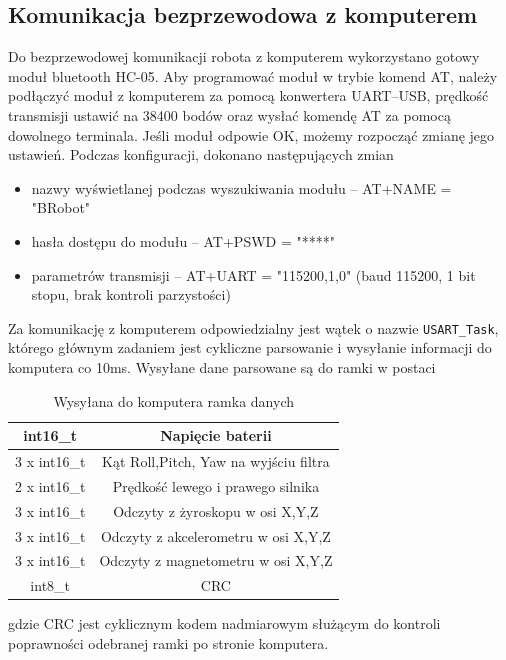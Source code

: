 \subsection{Komunikacja bezprzewodowa z komputerem}

Do bezprzewodowej komunikacji robota z komputerem wykorzystano gotowy moduł bluetooth HC-05. Aby programować moduł w trybie komend AT, należy podłączyć moduł z komputerem za pomocą konwertera UART--USB, prędkość transmisji ustawić na 38400 bodów oraz wysłać komendę AT za pomocą dowolnego terminala. Jeśli moduł odpowie OK, możemy rozpocząć zmianę jego ustawień. Podczas konfiguracji, dokonano następujących zmian
\begin{itemize}
    \item nazwy wyświetlanej podczas wyszukiwania modułu -- AT+NAME = "BRobot"
    \item hasła dostępu do modułu -- AT+PSWD = "****"
    \item parametrów transmisji -- AT+UART = "115200,1,0" (baud 115200, 1 bit stopu, brak kontroli parzystości)
\end{itemize}

Za komunikację z komputerem odpowiedzialny jest wątek o nazwie \texttt{USART\_Task}, którego głównym zadaniem jest cykliczne parsowanie i wysyłanie informacji do komputera co 10ms. Wysyłane dane parsowane są do ramki w postaci

\begin{table}[h!]
    \centering
    \caption{Wysyłana do komputera ramka danych}
    \begin{tabular}{|c|c|}
        \hline
        int16\_t & Napięcie baterii \\
        \hline
        3 x int16\_t & Kąt Roll,Pitch, Yaw na wyjściu filtra \\
        \hline
        2 x int16\_t & Prędkość lewego i prawego silnika \\
        \hline
        3 x int16\_t & Odczyty z żyroskopu w osi X,Y,Z \\
        \hline
        3 x int16\_t & Odczyty z akcelerometru w osi X,Y,Z \\
        \hline
        3 x int16\_t & Odczyty z magnetometru w osi X,Y,Z \\
        \hline
        int8\_t & CRC \\
        \hline
    \end{tabular}
    \label{Ramka wysylana}
\end{table}
gdzie CRC jest cyklicznym kodem nadmiarowym służącym do kontroli poprawności odebranej ramki po stronie komputera.

